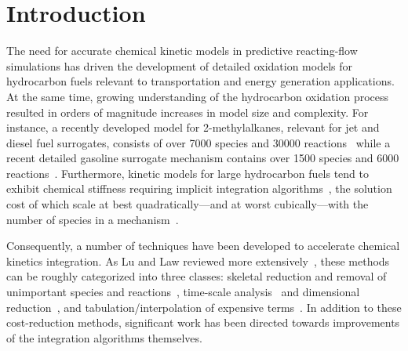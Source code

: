\documentclass[preprint]{elsarticle}
\begin{document}
\section{Introduction}
\label{sec:Intro}

The need for accurate chemical kinetic models in predictive reacting-flow simulations has driven the development of detailed oxidation models for hydrocarbon fuels relevant to transportation and energy generation applications.
At the same time, growing understanding of the hydrocarbon oxidation process resulted in orders of magnitude increases in model size and complexity.
For instance, a recently developed model for 2-methylalkanes, relevant for jet and diesel fuel surrogates, consists of over 7000 species and 30000 reactions~\cite{Sarathy:2011kx} while a recent detailed gasoline surrogate mechanism contains over 1500 species and 6000 reactions~\cite{Mehl:2011jn}.
Furthermore, kinetic models for large hydrocarbon fuels tend to exhibit chemical stiffness requiring implicit integration algorithms~\cite{Lu:2009gh}, the solution cost of which scale at best quadratically---and at worst cubically---with the number of species in a mechanism~\cite{Lu:2009gh}.

Consequently, a number of techniques have been developed to accelerate chemical kinetics integration.
As Lu and Law reviewed more extensively~\cite{Lu:2009gh}, these methods can be roughly categorized into three classes: skeletal reduction and removal of unimportant species and reactions~\cite{Lu:2005,Pepiot-Desjardins:2008,Niemeyer:2010bt,Niemeyer:2014,Curtis:2015aa}, time-scale analysis~\cite{qssa,pe_approx1,pe_approx2} and dimensional reduction~\cite{Lam:1988wc,Maas:1992aa,Lu:2001ve}, and tabulation\slash interpolation of expensive terms~\cite{Pope:1997wu,Christo1996}.
In addition to these cost-reduction methods, significant work has been directed towards improvements of the integration algorithms themselves.
\end{document}
